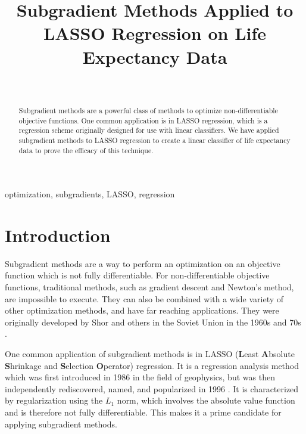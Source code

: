 \documentclass[journal,onecolumn]{IEEEtran}
\begin{document}
\title{
Subgradient Methods Applied to LASSO Regression on Life Expectancy Data
}

\author{\\
}


\maketitle

\begin{abstract}
Subgradient methods are a powerful class of methods to optimize non-differentiable objective functions. One common application is in LASSO regression, which is a regression scheme originally designed for use with linear classifiers. We have applied subgradient methods to LASSO regression to create a linear classifier of life expectancy data to prove the efficacy of this technique.
\end{abstract}

\begin{IEEEkeywords}
optimization, subgradients, LASSO, regression
\end{IEEEkeywords}

\section{Introduction}\label{sec:intro}
Subgradient methods are a way to perform an optimization on an objective function which is not fully differentiable. For non-differentiable objective functions, traditional methods, such as gradient descent and Newton's method, are impossible to execute. They can also be combined with a wide variety of other optimization methods, and have far reaching applications. They were originally developed by Shor and others in the Soviet Union in the 1960s and 70s \cite{boydparksubgradients} \cite{boydxiaosubgradients}.

One common application of subgradient methods is in LASSO (\textbf{L}east \textbf{A}bsolute \textbf{S}hrinkage and \textbf{S}election \textbf{O}perator) regression. It is a regression analysis method which was first introduced in 1986 \cite{lassooriginal} in the field of geophysics, but was then independently rediscovered, named, and popularized in 1996 \cite{lassopaper}. It is characterized by regularization using the \(L_1\) norm, which involves the absolute value function and is therefore not fully differentiable. This makes it a prime candidate for applying subgradient methods. 
\end{document}
